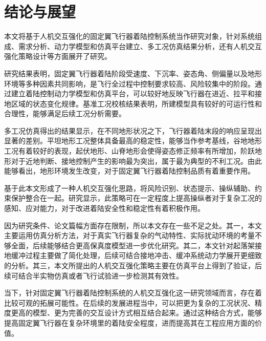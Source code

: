 
\chapter{结论与展望}

本文将基于人机交互强化的固定翼飞行器着陆控制系统当作研究对象，针对系统组成、需求分析、动力学模型和仿真平台建立、多工况仿真结果分析，还有人机交互强化策略设计等方面展开了研究。

研究结果表明，固定翼飞行器着陆阶段受速度、下沉率、姿态角、侧偏量以及地形环境等多种因素共同影响，是飞行全过程中控制要求较高、风险较集中的阶段。通过建立着陆控制动力学模型和仿真平台，可以较好地反映飞行器在进近、拉平和接地区域的状态变化规律。基准工况校核结果表明，所建模型具有较好的可运行性和合理性，能够满足后续工况分析需要。

多工况仿真得出的结果显示，在不同地形状况之下，飞行器着陆末段的响应呈现出显著的差别。平坦地形工况整体具备最高的稳定性，能够当作参考基线，谷地地形工况有着较好的表现，起伏地形、山脊地形会使得姿态修正频率有所增加，阶跃地形对于近地判断、接地控制产生的影响最为突出，属于最为典型的不利工况。由此能够看出，地形环境发生改变，对于固定翼飞行器着陆控制品质有着重要作用。

基于此本文形成了一种人机交互强化思路，将风险识别、状态提示、操纵辅助、约束保护整合在一起。研究显示，此策略可在一定程度上提高操纵者对于复杂工况的感知、应对能力，对于改进着陆安全性和稳定性有着积极作用。

因为研究条件、论文篇幅方面存在限制，所以本文存在一些不足之处。其一，本文主要运用仿真分析方法，对于真实飞行器复杂的气动特性、实际扰动环境的考量不够全面，后续能够结合更高保真度模型进一步优化研究。其二，本文针对起落架接地缓冲过程主要做了简化处理，后续可结合接地冲击、缓冲系统动力学展开更细致的分析。其三，本文所提出的人机交互强化策略主要在仿真平台上得到了验证，后续可结合半实物仿真或者飞行试验进一步检测其有效性。

当下，针对固定翼飞行器着陆控制系统的人机交互强化这一研究领域而言，存在着比较可观的拓展可能性。在后续的发展进程当中，可以把更为复杂的工况状况、精度更高的模型、更为完善的交互设计方式相互结合起来。通过这种结合方式，能够提高固定翼飞行器在复杂环境里的着陆安全程度，进而提高其在工程应用方面的价值。
